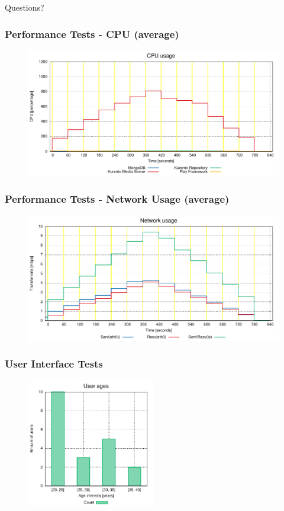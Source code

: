 \documentclass[compress]{beamer}
\begin{document}
\begin{frame}[c]
\Huge{\centerline{Questions?}}
\end{frame}
	\begin{frame}[c]
		\frametitle{Performance Tests - CPU (average)}
		\begin{figure}[H]
			\includegraphics[width=\textwidth]{figures/cpu_avg.pdf}
		\end{figure}
	\end{frame}

	\begin{frame}[c]
		\frametitle{Performance Tests - Network Usage (average)}
		\begin{figure}[H]
			\includegraphics[width=\textwidth]{figures/net_avg.pdf}
		\end{figure}
	\end{frame}


	\begin{frame}[c]
		\frametitle{User Interface Tests}
		\begin{figure}[H]
			\includegraphics[width=0.5\textwidth]{figures/user_ages.pdf}
		\end{figure}
	\end{frame}
\end{document}
